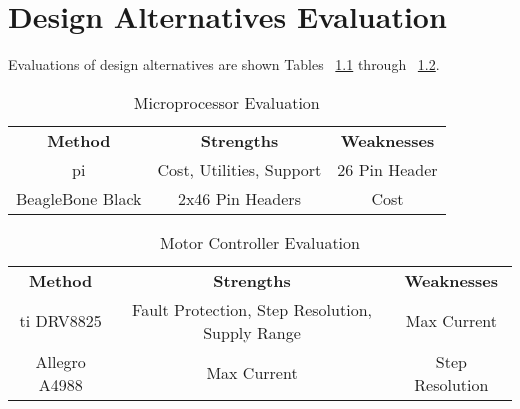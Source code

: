 \chapter{Design Alternatives Evaluation}
Evaluations of design alternatives are shown Tables ~\ref{table:uPEval} through ~\ref{table:MCEval}.

\begin{table}[ht]
	\caption{Microprocessor Evaluation}
	\label{table:uPEval}
	\centering
	\begin{tabular}{|c c c|} 
		\hline\hline
		\textbf{Method} & \textbf{Strengths} & \textbf{Weaknesses}\\
		\gls{pi} & Cost, Utilities, Support & 26 Pin Header\\
		BeagleBone Black & 2x46 Pin Headers & Cost \\
	\hline 
	\end{tabular}
\end{table}

\begin{table}[ht]
	\caption{Motor Controller Evaluation}
	\label{table:MCEval}
	\centering
	\begin{tabular}{|c c c|} 
		\hline\hline
		\textbf{Method} & \textbf{Strengths} & \textbf{Weaknesses}\\
		\gls{ti} DRV8825 & Fault Protection, Step Resolution, Supply Range & Max Current\\
		Allegro A4988 & Max Current & Step Resolution\\
		\hline
	\end{tabular}
\end{table}
